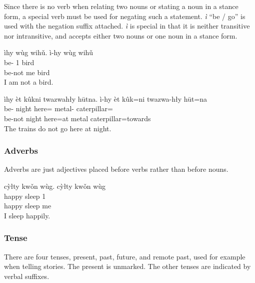\documentclass[12pt]{article}
\begin{document}
    Since there is no verb when relating two nouns
    or stating a noun in a stance form,
    a special verb must be used for negating such a statement.
    \textit{ì} ``be / go'' is used
    with the negation suffix attached.
    \textit{ì} is special in that
    it is neither transitive nor intransitive,
    and accepts either two nouns or one noun in a stance form.

    \begin{exe}
        \ex
        \glt
        ìhy wùg wihǔ.
        \glll
        ì-hy wùg wihǔ \\
        be-\Neg{} 1\Sg{} bird \\
        be-not me bird \\
        \glt
        I am not a bird.
    \end{exe}

    \begin{exe}
        \ex
        \glt
        ìhy èt kûkni twazwahły hūtna.
        \glll
        ì-hy èt kûk=ni twazwa-hły hūt=na \\
        be-\Neg{} night here=\InessTwo{} metal-\Adj{} caterpillar=\AdessTwo{} \\
        be-not night here=at metal caterpillar=towards \\
        \glt
        The trains do not go here at night.
    \end{exe}

    \subsubsection*{Adverbs}
    Adverbs are just adjectives placed before verbs rather than before nouns.

    \begin{exe}
        \ex
        \glt
        cỳłty kwǒn wùg.
        \glll
        cỳłty kwǒn wùg \\
        happy sleep 1\Sg{} \\
        happy sleep me \\
        \glt
        I sleep happily.
    \end{exe}

    \subsubsection*{Tense}
    There are four tenses, present, past, future, and remote past,
    used for example when telling stories.
    The present is unmarked.
    The other tenses are indicated by verbal suffixes.
\end{document}
